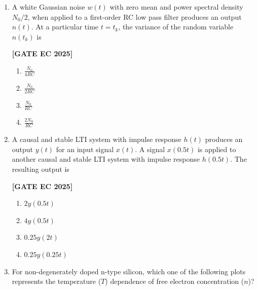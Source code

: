 \documentclass[12pt]{article}
\begin{document}
\begin{enumerate}[leftmargin=1.5em, label=\textbf{Q.\arabic*}., itemsep=2em]
\item A white Gaussian noise $w(t)$ with zero mean and power spectral density $N_0/2$, when applied to a first-order RC low pass filter produces an output $n(t)$. At a particular time $t = t_k$, the variance of the random variable $n(t_k)$ is

\noindent \textbf{[GATE EC 2025]}
\begin{multicols}{2}
\begin{enumerate}
    \item $\tfrac{N_0}{4RC}$
    \item $\tfrac{N_0}{2RC}$
    \item $\tfrac{N_0}{RC}$
    \item $\tfrac{2N_0}{RC}$
\end{enumerate}
\end{multicols}

\item A causal and stable LTI system with impulse response $h(t)$ produces an output $y(t)$ for an input signal $x(t)$. A signal $x(0.5t)$ is applied to another causal and stable LTI system with impulse response $h(0.5t)$. The resulting output is

\noindent \textbf{[GATE EC 2025]}
\begin{multicols}{2}
\begin{enumerate}
    \item $2y(0.5t)$
    \item $4y(0.5t)$
    \item $0.25y(2t)$
    \item $0.25y(0.25t)$
\end{enumerate}
\end{multicols}

\item For non-degenerately doped n-type silicon, which one of the following plots represents the temperature ($T$) dependence of free electron concentration ($n$)?


\end{enumerate}
\end{document}
